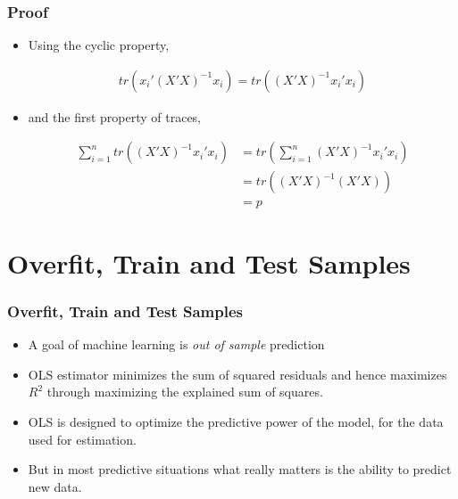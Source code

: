 \documentclass[
  shownotes,
  xcolor={svgnames},
  hyperref={colorlinks,citecolor=DarkBlue,linkcolor=DarkRed,urlcolor=DarkBlue}
  , aspectratio=169]{beamer}
\begin{document}
\begin{frame}[fragile]
\frametitle{Proof}

\begin{itemize}


\item Using the cyclic property, 

\begin{align}
tr(x_i'(X'X)^{-1}x_i)=tr((X'X)^{-1}x_i'x_i)
\end{align}
\medskip
\item and the first property of traces,

\begin{align}
\sum_{i=1}^n tr((X'X)^{-1}x_i'x_i) & = tr(\sum_{i=1}^n (X'X)^{-1}x_i'x_i) \\
            &=tr ((X'X)^{-1}(X'X)) \\
            &= p
\end{align}

\end{itemize}
\end{frame}

\section{Overfit, Train and Test Samples}
\begin{frame}
\frametitle{Overfit, Train and Test Samples}

\begin{itemize}
  \item A  goal of machine learning is \emph{out of sample} prediction
  \bigskip
  \item OLS estimator minimizes the sum of squared residuals and hence maximizes $R^2$ through maximizing the explained sum of squares. 
  \bigskip
  \item OLS is designed to optimize the predictive power of the model, for the data used for estimation. 
  \bigskip
  \item But in most predictive situations what really matters is the ability to predict new data.
  
  
\end{itemize}




\end{frame}
\end{document}
